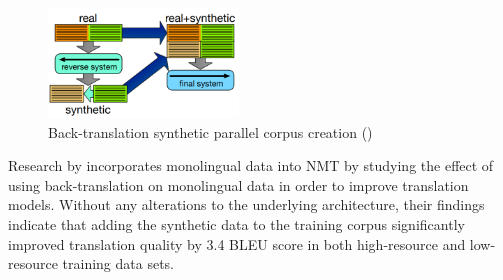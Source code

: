 \begin{figure}[ht!]
\centering
\includegraphics[width=0.45\textwidth]{media/literature/data_argumentation/da_back_trans.png}
\caption[Diagram of the back-translation synthetic parallel corpus]{Back-translation synthetic parallel corpus creation (\cite{hoang_iterative_2018})}
\label{fig:back_trans}
\end{figure}
Research by \cite{sennrich_improving_2016} incorporates monolingual data into \acrshort{NMT} by studying the effect of using back-translation on monolingual data in order to improve translation models.  Without any alterations to the underlying architecture, their findings indicate that adding the synthetic data to the training corpus significantly improved translation quality by 3.4 BLEU score in both high-resource and low-resource training data sets.








